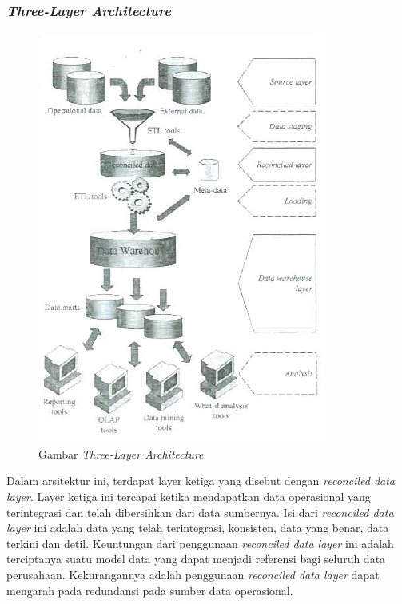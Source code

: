 \subsubsection{\textit{Three-Layer Architecture}}
\begin{figure}[h]
	\centering
	\includegraphics[scale=0.95]{Gambar/three-layer}
	\caption{Gambar \textit{Three-Layer Architecture}\cite{Matteo:2009}}
	\end{figure}
	
	Dalam arsitektur ini, terdapat layer ketiga yang disebut dengan \textit{reconciled data layer}. Layer ketiga ini tercapai ketika mendapatkan data operasional yang terintegrasi dan telah dibersihkan dari data sumbernya. Isi dari \textit{reconciled data layer} ini adalah data yang telah terintegrasi, konsisten, data yang benar, data terkini dan detil. Keuntungan dari penggunaan \textit{reconciled data layer} ini adalah terciptanya suatu model data yang dapat menjadi referensi bagi seluruh data perusahaan. Kekurangannya adalah penggunaan \textit{reconciled data layer} dapat mengarah pada redundansi pada sumber data operasional\cite{Matteo:2009}.


